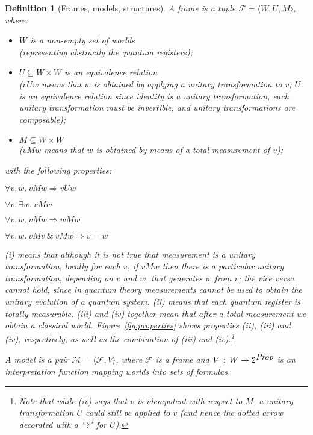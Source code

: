 \documentclass[times, 10pt]{article}
\newtheorem{definition}{Definition}
\begin{document}
\begin{definition}[Frames, models, structures]\label{def:semantics}
  A \emph{frame} 
  is a tuple $\mathscr{F} =
  \langle W, U, M\rangle$, where:
  \begin{itemize}
  \item $W$ is a non-empty set of \emph{worlds} \\
  (representing abstractly the quantum registers);
  \item $U\subseteq W\times W$ is an equivalence relation \\
  ($v U w$ means that $w$ is obtained by applying a unitary transformation to $v$; 
  $U$ is an equivalence relation since identity is a unitary transformation, 
  each unitary transformation must be invertible, and unitary transformations are composable);
  \item $M \subseteq W \times W$ \\
  ($v M w$ means that $w$ is obtained by means of a total measurement of $v$);
  \end{itemize}
with the following properties:
\begin{renum}
\item $\forall v, w.\ v M w \Longrightarrow v U w$ 
\item   $\forall v.\ \exists w.\ v M w$ 
\item $\forall v, w.\ v M w \Longrightarrow w M w$ 
\item $\forall v, w.\ v M v \ \& \ v M w \Longrightarrow v = w$ 
\end{renum}
\emph{(i)} means that although it is not true that measurement is a unitary transformation, locally for each $v$, if $v M w$ then there is a particular unitary transformation, depending on $v$ and $w$, that generates $w$ from $v$; the vice versa cannot hold, since in quantum theory measurements cannot be used to obtain the unitary evolution of a quantum system.
\emph{(ii)} means that each quantum register is totally measurable.
\emph{(iii)} and \emph{(iv)} together mean that after a total measurement we obtain a classical world.
Figure~\ref{fig:properties} shows properties \emph{(ii)}, \emph{(iii)} and \emph{(iv)}, respectively, as well as the combination of \emph{(iii)} and \emph{(iv)}.\footnote{Note that while (iv) says that $v$ is idempotent with respect to $M$, a unitary transformation $U$ could still be applied to $v$ (and hence the dotted arrow decorated with a ``?" for $U$).}
  
A \emph{model} is a pair $\mathscr{M}=\langle\mathscr{F}, V\rangle$,
where $\mathscr{F}$ is a frame and $V\,:\, W\rightarrow
2^{\mbox{\textit{Prop}}}$ is an interpretation function mapping worlds
into sets of formulas.
  

\end{definition}
\end{document}
